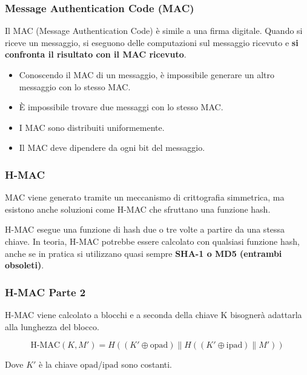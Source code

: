 \begin{frame}
	\frametitle{Message Authentication Code (MAC)}

	Il MAC (Message Authentication Code) è simile a una firma digitale.
	Quando si riceve un messaggio, si eseguono delle computazioni sul messaggio ricevuto e \textbf{si confronta il risultato con il MAC ricevuto}.

	\begin{itemize}
		\item Conoscendo il MAC di un messaggio, è impossibile generare un altro messaggio con lo stesso MAC.
		\item È impossibile trovare due messaggi con lo stesso MAC.
		\item I MAC sono distribuiti uniformemente.
		\item Il MAC deve dipendere da ogni bit del messaggio.
	\end{itemize}
\end{frame}

\begin{frame}
	\frametitle{H-MAC}

	MAC viene generato tramite un meccanismo di crittografia simmetrica, ma esistono anche soluzioni come H-MAC
	che sfruttano una funzione hash.

	\vspace{1cm}

	H-MAC esegue una funzione di hash due o tre volte a partire da una stessa chiave. In teoria, H-MAC potrebbe essere
	calcolato con qualsiasi funzione hash, anche se in pratica si utilizzano quasi sempre \textbf{SHA-1 o MD5 (entrambi obsoleti)}.


\end{frame}

\begin{frame}
	\frametitle{H-MAC Parte 2}

	H-MAC viene calcolato a blocchi e a seconda della chiave K bisognerà adattarla alla lunghezza del blocco.

	\[
		\text{H-MAC}(K, M') = H((K' \oplus \text{opad}) \| H((K' \oplus \text{ipad}) \| M'))
	\]

	Dove $K'$ è la chiave $\text{opad}$/$\text{ipad}$ sono costanti.

\end{frame}

